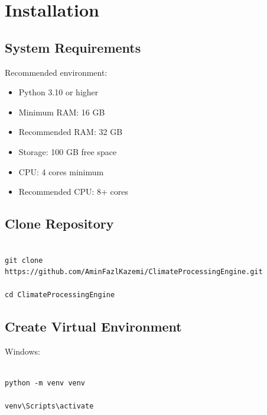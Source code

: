\documentclass[11pt,a4paper]{article}
\begin{document}
\section{Installation}


\subsection{System Requirements}


Recommended environment:


\begin{itemize}

\item Python 3.10 or higher

\item Minimum RAM: 16 GB

\item Recommended RAM: 32 GB

\item Storage: 100 GB free space

\item CPU: 4 cores minimum

\item Recommended CPU: 8+ cores

\end{itemize}



\subsection{Clone Repository}


\begin{verbatim}

git clone https://github.com/AminFazlKazemi/ClimateProcessingEngine.git

cd ClimateProcessingEngine

\end{verbatim}



\subsection{Create Virtual Environment}



Windows:


\begin{verbatim}

python -m venv venv

venv\Scripts\activate

\end{verbatim}
\end{document}
